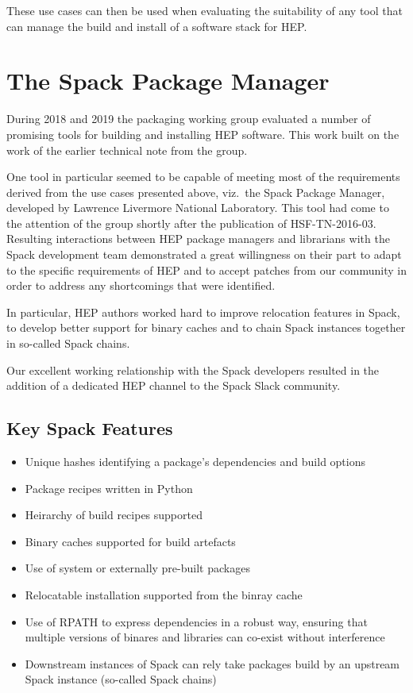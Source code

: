\documentclass{webofc}
\begin{document}
These use cases can then be used when evaluating the suitability of any 
tool that can manage the build and install of a software stack for HEP.

\section{The Spack Package Manager}
\label{spack}

During 2018 and 2019 the packaging working group evaluated a number
of promising tools for building and installing HEP software. This work
built on the work of the earlier technical note from the group\cite{l_sexton_kennedy_2016_1472340}.

One tool in particular seemed to be capable of meeting most of the requirements
derived from the use cases presented above, viz.\ the Spack Package Manager,
developed by Lawrence Livermore National
Laboratory\cite{10.1145/2807591.2807623}. This tool had come to the attention
of the group shortly after the publication of HSF-TN-2016-03. Resulting
interactions between HEP package managers and librarians with the Spack
development team demonstrated a great willingness on their part to adapt to the
specific requirements of HEP and to accept patches from our community in order
to address any shortcomings that were identified.

In particular, HEP authors worked hard to improve relocation features
in Spack, to develop better support for binary caches and to chain Spack
instances together in so-called Spack chains.

Our excellent working relationship with the Spack developers resulted
in the addition of a dedicated HEP channel to the Spack Slack community.

\subsection{Key Spack Features}
\label{spack-features}

\begin{itemize}
    \item Unique hashes identifying a package's dependencies and build options
    \item Package recipes written in Python
    \item Heirarchy of build recipes supported
    \item Binary caches supported for build artefacts
    \item Use of system or externally pre-built packages
    \item Relocatable installation supported from the binray cache
    \item Use of RPATH to express dependencies in a robust way, ensuring that
        multiple versions of binares and libraries can co-exist without
        interference
    \item Downstream instances of Spack can rely take packages
        build by an upstream Spack instance (so-called Spack chains)
\end{itemize}
\end{document}

